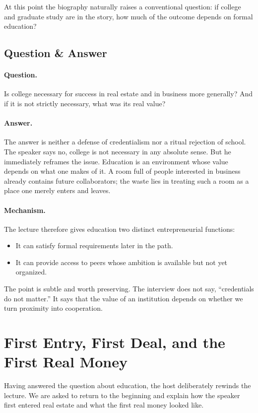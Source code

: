 At this point the biography naturally raises a conventional question: if college and graduate study are in the story, how much of the outcome depends on formal education?

\subsection{Question \& Answer}

\paragraph{Question.}
Is college necessary for success in real estate and in business more generally? And if it is not strictly necessary, what was its real value?

\paragraph{Answer.}
The answer is neither a defense of credentialism nor a ritual rejection of school. The speaker says no, college is not necessary in any absolute sense. But he immediately reframes the issue. Education is an environment whose value depends on what one makes of it. A room full of people interested in business already contains future collaborators; the waste lies in treating such a room as a place one merely enters and leaves.

\paragraph{Mechanism.}
The lecture therefore gives education two distinct entrepreneurial functions:
\begin{itemize}
\item It can satisfy formal requirements later in the path.
\item It can provide access to peers whose ambition is available but not yet organized.
\end{itemize}
The point is subtle and worth preserving. The interview does not say, ``credentials do not matter.'' It says that the value of an institution depends on whether we turn proximity into cooperation.

\section{First Entry, First Deal, and the First Real Money}

Having answered the question about education, the host deliberately rewinds the lecture. We are asked to return to the beginning and explain how the speaker first entered real estate and what the first real money looked like.

